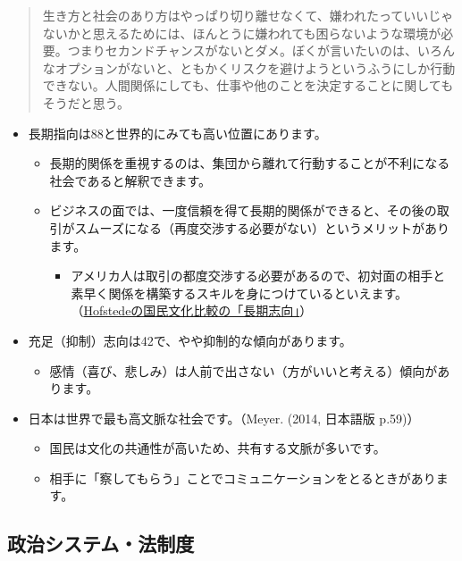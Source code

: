 \documentclass[
]{book}
\providecommand{\tightlist}{%
  \setlength{\itemsep}{0pt}\setlength{\parskip}{0pt}}
\begin{document}
\begin{quote}
生き方と社会のあり方はやっぱり切り離せなくて、嫌われたっていいじゃないかと思えるためには、ほんとうに嫌われても困らないような環境が必要。つまりセカンドチャンスがないとダメ。ぼくが言いたいのは、いろんなオプションがないと、ともかくリスクを避けようというふうにしか行動できない。人間関係にしても、仕事や他のことを決定することに関してもそうだと思う。
\end{quote}

\begin{itemize}
\item
  長期指向は88と世界的にみても高い位置にあります。

  \begin{itemize}
  \item
    長期的関係を重視するのは、集団から離れて行動することが不利になる社会であると解釈できます。
  \item
    ビジネスの面では、一度信頼を得て長期的関係ができると、その後の取引がスムーズになる（再度交渉する必要がない）というメリットがあります。

    \begin{itemize}
    \tightlist
    \item
      アメリカ人は取引の都度交渉する必要があるので、初対面の相手と素早く関係を構築するスキルを身につけているといえます。（\protect\hyperlink{hofstede}{Hofstedeの国民文化比較の「長期志向」}）
    \end{itemize}
  \end{itemize}
\item
  充足（抑制）志向は42で、やや抑制的な傾向があります。

  \begin{itemize}
  \tightlist
  \item
    感情（喜び、悲しみ）は人前で出さない（方がいいと考える）傾向があります。
  \end{itemize}
\item
  日本は世界で最も高文脈な社会です。（Meyer. (2014, 日本語版 p.59)）

  \begin{itemize}
  \item
    国民は文化の共通性が高いため、共有する文脈が多いです。
  \item
    相手に「察してもらう」ことでコミュニケーションをとるときがあります。
  \end{itemize}
\end{itemize}

\hypertarget{japan-politics}{%
\subsection{政治システム・法制度}\label{japan-politics}}
\end{document}
